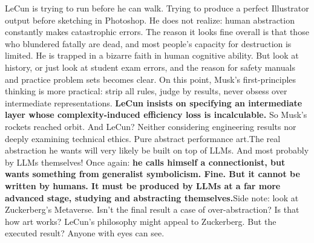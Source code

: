 \documentclass[11pt]{article}
\renewcommand{\\}[1][\mynewlineskip]{\oldnewline[#1]}
\begin{document}
LeCun is trying to run before he can walk. Trying to produce a perfect Illustrator output before sketching in Photoshop. He does not realize: human abstraction constantly makes catastrophic errors. The reason it looks fine overall is that those who blundered fatally are dead, and most people's capacity for destruction is limited. He is trapped in a bizarre faith in human cognitive ability. But look at history, or just look at student exam errors, and the reason for safety manuals and practice problem sets becomes clear. On this point, Musk's first-principles thinking is more practical: strip all rules, judge by results, never obsess over intermediate representations. \textbf{LeCun insists on specifying an intermediate layer whose complexity-induced efficiency loss is incalculable. }So Musk's rockets reached orbit. And LeCun? Neither considering engineering results nor deeply examining technical ethics. Pure abstract performance art.\\
The real abstraction he wants will very likely be built on top of LLMs. And most probably by LLMs themselves! Once again: \textbf{he calls himself a connectionist, but wants something from generalist symbolicism. Fine. But it cannot be written by humans. It must be produced by LLMs at a far more advanced stage, studying and abstracting themselves.}\\
Side note: look at Zuckerberg's Metaverse. Isn't the final result a case of over-abstraction? Is that how art works? LeCun's philosophy might appeal to Zuckerberg. But the executed result? Anyone with eyes can see.
\end{document}
